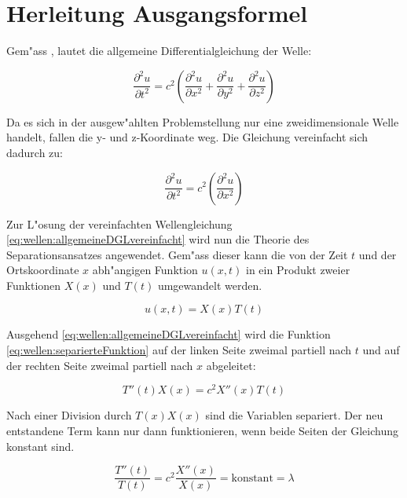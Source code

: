 \section{Herleitung Ausgangsformel}
Gem"ass \cite{wellen:smirnow2}, lautet die allgemeine Differentialgleichung der 
Welle:

\begin{equation*}
	\frac{\partial^2 u}{\partial t^2}
	=
	c^2
	\left(
		\frac{\partial^2 u}{\partial x^2} 
		+ \frac{\partial^2 u}{\partial y^2} 
		+ \frac{\partial^2 u}{\partial z^2}
	\right)
	\label{eq:wellen:allgemeineDGL}
\end{equation*}

Da es sich in der ausgew"ahlten Problemstellung nur eine zweidimensionale Welle 
handelt, fallen die y- und z-Koordinate weg. Die Gleichung vereinfacht sich 
dadurch zu:

\begin{equation}
	\frac{\partial^2 u}{\partial t^2}
	=
	c^2
	\left(
		\frac{\partial^2 u}{\partial x^2} 
	\right)
	\label{eq:wellen:allgemeineDGLvereinfacht}
\end{equation}

Zur L"osung der vereinfachten Wellengleichung 
\ref{eq:wellen:allgemeineDGLvereinfacht} wird nun die Theorie des 
Separationsansatzes angewendet. Gem"ass dieser kann die von der Zeit $t$ und 
der Ortskoordinate $x$ abh"angigen Funktion $u(x,t)$ in ein Produkt 
zweier Funktionen $X(x)$ und $T(t)$ umgewandelt werden.

\begin{equation}
	u (x,t) = X(x) T(t)
	\label{eq:wellen:separierteFunktion}
\end{equation}

Ausgehend \ref{eq:wellen:allgemeineDGLvereinfacht} wird die Funktion 
\ref{eq:wellen:separierteFunktion} auf der linken Seite zweimal partiell nach 
$t$ und auf der rechten Seite zweimal partiell nach $x$ abgeleitet:

\begin{equation*}
	T''(t) X(x) = c^2 X''(x)T(t)
\end{equation*}

Nach einer Division durch $T(x)X(x)$ sind die Variablen separiert. Der neu 
entstandene Term kann nur dann funktionieren, wenn beide Seiten der Gleichung 
konstant sind.

\begin{equation*}
	\frac{T''(t)}{T(t)}
	=
	c^2 \frac{X''(x)}{X(x)} = \text{konstant} = \lambda
\end{equation*}

